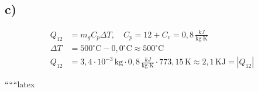 

\subsection*{c)}
\begin{align*}
Q_{12} &= m_g C_p \Delta T, \quad C_p = 12 + C_v = 0,8 \, \frac{kJ}{\text{kg} \cdot \text{K}} \\
\Delta T &= 500^\circ \text{C} - 0,0^\circ \text{C} \approx 500^\circ \text{C} \\
Q_{12} &= 3,4 \cdot 10^{-3} \, \text{kg} \cdot 0,8 \, \frac{kJ}{\text{kg} \cdot \text{K}} \cdot 773,15 \, \text{K} \approx 2,1 \, \text{KJ} = |Q_{12}|
\end{align*}

``````latex